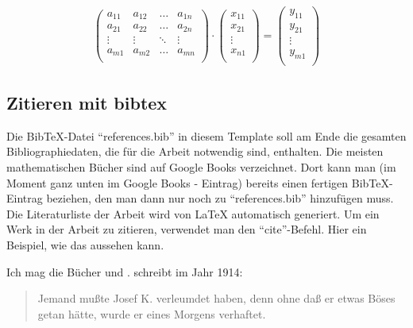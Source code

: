   \begin{align}\label{eq:rational}
    \begin{pmatrix}
        a_{11} & a_{12} & \dots & a_{1n} \\ %
        a_{21} & a_{22} & \dots & a_{2n} \\ %
        \vdots & \vdots & \ddots & \vdots \\
        a_{m1} & a_{m2} & \dots & a_{mn} \\
    \end{pmatrix} \cdot
    \begin{pmatrix}
        x_{11} \\
        x_{21} \\
        \vdots \\
        x_{n1} \\
    \end{pmatrix} =
    \begin{pmatrix}
        y_{11} \\
        y_{21} \\
        \vdots \\
        y_{m1} \\
    \end{pmatrix} 
  \end{align}

\subsection{Zitieren mit bibtex}

Die BibTeX-Datei ``references.bib'' in diesem Template soll am Ende die gesamten Bibliographiedaten, die für die Arbeit notwendig sind, enthalten.
Die meisten mathematischen Bücher sind auf Google Books verzeichnet. Dort kann man (im Moment ganz unten im Google Books - Eintrag) bereits einen fertigen BibTeX-Eintrag beziehen, den man dann nur noch zu ``references.bib'' hinzufügen muss. Die Literaturliste der Arbeit wird von LaTeX automatisch generiert. Um ein Werk in der Arbeit zu zitieren, verwendet man den ``cite''-Befehl. Hier ein Beispiel, wie das aussehen kann.

Ich mag die Bücher \cite[]{kafka2015prozess} und \cite{AC02615918}. \textcite[S. 1]{kafka2015prozess} schreibt im Jahr 1914:
\begin{quote}
Jemand mußte Josef K. verleumdet haben, denn ohne daß er etwas Böses getan hätte, wurde er eines Morgens verhaftet.
\end{quote}

